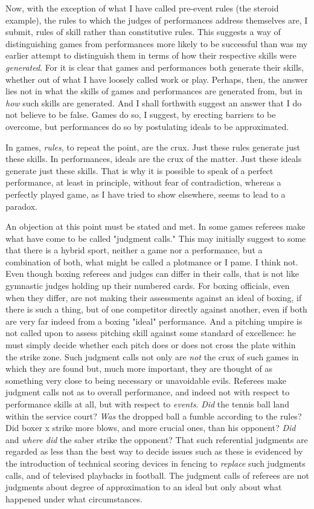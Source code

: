 \documentclass{tufte-handout}
\begin{document}
Now, with the exception of what I have called pre-event rules (the steroid example), the rules to which the judges of performances address themselves are, I submit, rules of skill rather than constitutive rules. This suggests a way of distinguishing games from performances more likely to be successful than was my earlier attempt to distinguish them in terms of how their respective skills were \textit{generated}. For it is clear that games and performances both generate their skills, whether out of what I have loosely called work or play. Perhaps, then, the answer lies not in what the skills of games and performances are generated from, but in \textit{how} such skills are generated. And I shall forthwith suggest an answer that I do not believe to be false. Games do so, I suggest, by erecting barriers to be overcome, but performances do so by postulating ideals to be approximated. 

In games, \textit{rules}, to repeat the point, are the crux. Just these rules generate just these skills. In performances, ideals are the crux of the matter. Just these ideals generate just these skills. That is why it is possible to speak of a perfect performance, at least in principle, without fear of contradiction, whereas a perfectly played game, as I have tried to show elsewhere, seems to lead to a paradox. 

An objection at this point must be stated and met. In some games referees make what have come to be called "judgment calls." This may initially suggest to some that there is a hybrid sport, neither a game nor a performance, but a combination of both, what might be called a plotmance or I pame. I think not. Even though boxing referees and judges can differ in their calls, that is not like gymnastic judges holding up their numbered cards. For boxing officials, even when they differ, are not making their assessments against an ideal of boxing, if there is such a thing, but of one competitor directly against another, even if both are very far indeed from a boxing "ideal" performance. And a pitching umpire is not called upon to assess pitching skill against some standard of excellence: he must simply decide whether each pitch does or does not cross the plate within the strike zone. Such judgment calls not only are \textit{not} the crux of such games in which they are found but, much more important, they are thought of as something very close to being necessary or unavoidable evils. Referees make judgment calls not as to overall performance, and indeed not with respect to performance skills at all, but with respect to \textit{events}. \textit{Did} the tennis ball land within the service court? \textit{Was} the dropped ball a fumble according to the rules? Did boxer x strike more blows, and more crucial ones, than his opponent? \textit{Did} and \textit{where did} the saber strike the opponent? That such referential judgments are regarded as less than the best way to decide issues such as these is evidenced by the introduction of technical scoring devices in fencing to \textit{replace} such judgments calls, and of televised playbacks in football. The judgment calls of referees are not judgments about degree of approximation to an ideal but only about what happened under what circumstances. 
\end{document}
